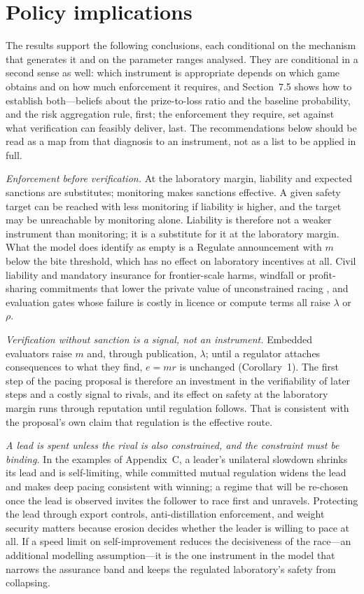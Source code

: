 \documentclass[11pt]{article}
\theoremstyle{plain}
\theoremstyle{definition}
\theoremstyle{remark}
\begin{document}
\section{Policy implications}

The results support the following conclusions, each conditional on the mechanism that generates it and on the parameter ranges analysed. They are conditional in a second sense as well: which instrument is appropriate depends on which game obtains and on how much enforcement it requires, and Section~7.5 shows how to establish both---beliefs about the prize-to-loss ratio and the baseline probability, and the risk aggregation rule, first; the enforcement they require, set against what verification can feasibly deliver, last. The recommendations below should be read as a map from that diagnosis to an instrument, not as a list to be applied in full.

\emph{Enforcement before verification.} At the laboratory margin, liability and expected sanctions are substitutes; monitoring makes sanctions effective. A given safety target can be reached with less monitoring if liability is higher, and the target may be unreachable by monitoring alone. Liability is therefore not a weaker instrument than monitoring; it is a substitute for it at the laboratory margin. What the model does identify as empty is a Regulate announcement with $m$ below the bite threshold, which has no effect on laboratory incentives at all. Civil liability and mandatory insurance for frontier-scale harms, windfall or profit-sharing commitments that lower the private value of unconstrained racing \citep{okeefe2020,askell2019}, and evaluation gates whose failure is costly in licence or compute terms all raise $\lambda$ or $\rho$.

\emph{Verification without sanction is a signal, not an instrument.} Embedded evaluators raise $m$ and, through publication, $\lambda$; until a regulator attaches consequences to what they find, $e=mr$ is unchanged (Corollary~1). The first step of the pacing proposal \citep{amodei2026} is therefore an investment in the verifiability of later steps and a costly signal to rivals, and its effect on safety at the laboratory margin runs through reputation until regulation follows. That is consistent with the proposal's own claim that regulation is the effective route.

\emph{A lead is spent unless the rival is also constrained, and the constraint must be binding.} In the examples of Appendix~C, a leader's unilateral slowdown shrinks its lead and is self-limiting, while committed mutual regulation widens the lead and makes deep pacing consistent with winning; a regime that will be re-chosen once the lead is observed invites the follower to race first and unravels. Protecting the lead through export controls, anti-distillation enforcement, and weight security matters because erosion decides whether the leader is willing to pace at all. If a speed limit on self-improvement reduces the decisiveness of the race---an additional modelling assumption---it is the one instrument in the model that narrows the assurance band and keeps the regulated laboratory's safety from collapsing.
\end{document}
